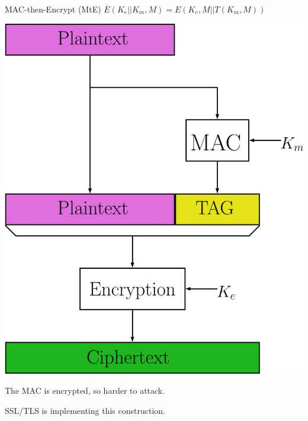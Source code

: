 \documentclass[11pt]{beamer}
\begin{document}
\begin{frame}{MAC-then-Encrypt (MtE)}
$\overline{E}(K_e||K_m, M) = E(K_e,M||T(K_m, M))$

\begin{center}
\includegraphics[scale=0.07]{MthenE.jpg}
\end{center}

The MAC is encrypted, so harder to attack.

SSL/TLS is implementing this construction.
\end{frame}
\end{document}
